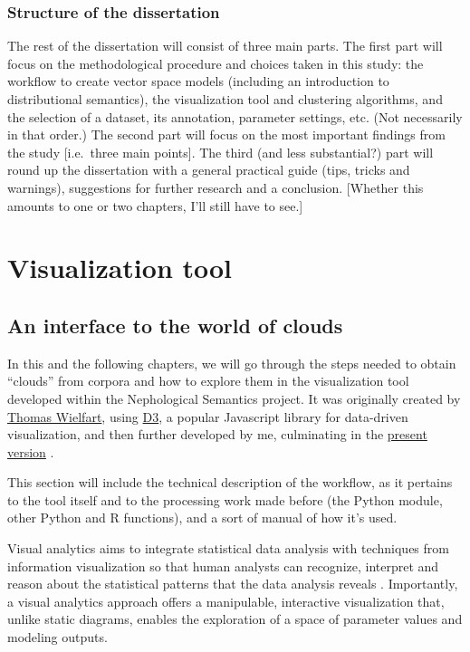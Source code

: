 \documentclass[
]{book}
\begin{document}
\hypertarget{str}{%
\section{Structure of the dissertation}\label{str}}

The rest of the dissertation will consist of three main parts.
The first part will focus on the methodological procedure and choices taken in this study:
the workflow to create vector space models (including an introduction to distributional semantics),
the visualization tool and clustering algorithms, and the selection of a dataset, its annotation, parameter settings, etc. (Not necessarily in that order.)
The second part will focus on the most important findings from the study {[}i.e.~three main points{]}.
The third (and less substantial?) part will round up the dissertation with a general practical guide (tips, tricks and warnings),
suggestions for further research and a conclusion. {[}Whether this amounts to one or two chapters, I'll still have to see.{]}

\hypertarget{part-visualization-tool}{%
\part{Visualization tool}\label{part-visualization-tool}}

\hypertarget{an-interface-to-the-world-of-clouds}{%
\chapter{An interface to the world of clouds}\label{an-interface-to-the-world-of-clouds}}

In this and the following chapters, we will go through the steps needed to obtain ``clouds'' from corpora and how to explore them in the visualization tool developed within the Nephological Semantics project. It was originally created by \href{https://github.com/tokenclouds/tokenclouds.github.io}{Thomas Wielfart},
using \href{https://d3js.org}{D3}, a popular Javascript library for data-driven visualization, and then further developed by me, culminating in the \href{https://github.com/qlvl/NephoVis}{present version} \autocite{montes.qlvl_2021}.

This section will include the technical description of the workflow, as it pertains
to the tool itself and to the processing work made before (the Python module, other
Python and R functions), and a sort of manual of how it's used.

Visual analytics aims to integrate statistical data analysis with techniques from information visualization so that human analysts can recognize, interpret and reason about the statistical patterns that the data analysis reveals \autocite{card.etal_1999}. Importantly, a visual analytics approach offers a manipulable, interactive visualization that, unlike static diagrams, enables the exploration of a space of parameter values and modeling outputs.
\end{document}
